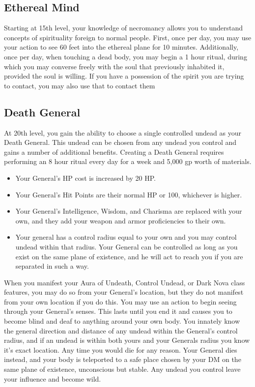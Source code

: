 \subsection{Ethereal Mind}
Starting at 15th level, your knowledge of necromancy allows you to understand concepts of spirituality foreign to normal people. First, once per day, you may use your action to see 60 feet into the ethereal plane for 10 minutes.
Additionally, once per day, when touching a dead body, you may begin a 1 hour ritual, during which you may converse freely with the soul that previously inhabited it, provided the soul is willing. If you have a possession of the spirit you are trying to contact, you may also use that to contact them

\subsection{Death General}
At 20th level, you gain the ability to choose a single controlled undead as your Death General. This undead can be chosen from any undead you control and gains a number of additional benefits.
Creating a Death General requires performing an 8 hour ritual every day for a week and 5,000 gp worth of materials.
\begin{itemize}
\item Your General’s HP cost is increased by 20 HP.
\item Your General’s Hit Points are their normal HP or 100, whichever is higher.
\item Your General’s Intelligence, Wisdom, and Charisma are replaced with your own, and they add your weapon and armor proficiencies to their own.
\item Your general has a control radius equal to your own and you may control undead within that radius. Your General can be controlled as long as you exist on the same plane of existence, and he will act to reach you if you are separated in such a way.
\end{itemize}
When you manifest your Aura of Undeath, Control Undead, or Dark Nova class features, you may do so from your General’s location, but they do not manifest from your own location if you do this.
You may use an action to begin seeing through your General’s senses. This lasts until you end it and causes you to become blind and deaf to anything around your own body.
You innately know the general direction and distance of any undead within the General’s control radius, and if an undead is within both yours and your Generals radius you know it’s exact location.
Any time you would die for any reason. Your General dies instead, and your body is teleported to a safe place chosen by your DM on the same plane of existence, unconscious but stable. Any undead you control leave your influence and become wild.\\

